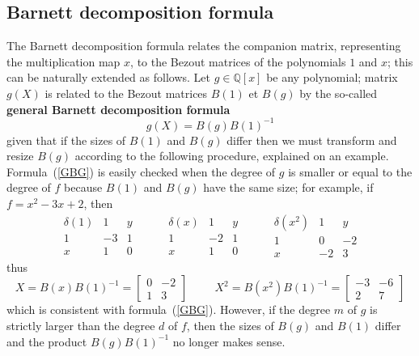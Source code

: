 \documentclass{standalone}
\begin{document}
\subsection{Barnett decomposition formula}
\label{Bar_gen}
The Barnett decomposition formula relates the companion matrix, representing the multiplication map $x$, to the Bezout matrices of the polynomials $1$ and $x$; this can be naturally extended as follows.
Let $g \in \mathbb{Q}[x]$ be any polynomial; matrix $g(X)$ is related to the Bezout matrices $B(1)$ et $B(g)$ by the so-called {\bf general Barnett decomposition formula}
\begin{equation}
	\label{GBG}
	g(X) = B(g)B(1)^{-1}
\end{equation}
given that if the sizes of $B(1)$ and $B(g)$ differ then we must transform and resize $B(g)$ according to the following procedure, explained on an example.
Formula~(\ref{GBG}) is easily checked when the degree of $g$ is smaller or equal to the degree of $f$ because $B(1)$ and $B(g)$ have the same size;
for example, if $f = x^2 - 3x + 2$, then
$$
\begin{array}{c|cc}
	\delta(1) & 1 & y \\
	\hline
	1 & -3 & 1 \\
	x & 1 & 0
\end{array}
\hspace{1cm}
\begin{array}{c|cc}
	\delta(x) & 1 & y \\
	\hline
	1 & -2 & 1 \\
	x & 1 & 0
\end{array}
\hspace{1cm}
\begin{array}{c|cc}
	\delta(x^2) & 1 & y \\
	\hline
	1 & 0 & -2 \\
	x & -2 & 3
\end{array}
$$
thus
\begin{equation}
	X = B(x)B(1)^{-1} =
	\begin{bmatrix}
		0 & -2 \\
		1 & 3
	\end{bmatrix}
	\hspace{1cm}
	X^2 = B(x^2)B(1)^{-1} =
	\begin{bmatrix}
		-3 & -6 \\
		2 & 7
	\end{bmatrix}
\end{equation}
which is consistent with formula~(\ref{GBG}).
However, if the degree $m$ of $g$ is strictly larger than the degree $d$ of $f$, then the sizes of $B(g)$ and $B(1)$ differ and the product $B(g)B(1)^{-1}$ no longer makes sense. 
\end{document}
